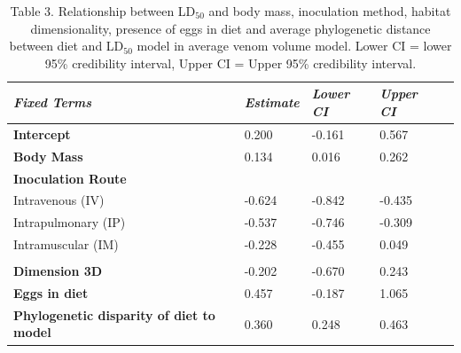 \begin{table}[H]
  \centering
    \caption*{Table 3. Relationship between LD$_{50}$ and body mass, inoculation method, habitat dimensionality, presence of eggs in diet and average phylogenetic distance between diet and LD$_{50}$ model in average venom volume model. Lower CI = lower 95\% credibility interval, Upper CI = Upper 95\% credibility interval.}
\begin{tabular}{*5l}    \toprule
\emph{Fixed Terms} & \emph{Estimate} & \emph{Lower CI} & \emph{Upper CI}\\\midrule
\textbf{Intercept} & 0.200  &  -0.161 & 0.567 \\ 
\textbf{Body Mass} & 0.134  & 0.016 & 0.262 \\ 
\textbf{Inoculation Route} &  &  &  \\ 
 Intravenous (IV) &  -0.624 &  -0.842 &  -0.435 \\
 Intrapulmonary (IP) &  -0.537 &  -0.746 &  -0.309 \\ 
 Intramuscular (IM) &  -0.228 &  -0.455 & 0.049 \\
  &  &  &  \\ 
\textbf{Dimension 3D} &  -0.202 &  -0.670 & 0.243 \\ 
\textbf{Eggs in diet} & 0.457 &  -0.187 & 1.065 \\ 
\textbf{Phylogenetic disparity of diet to model} & 0.360 & 0.248 & 0.463 \\\bottomrule
 \hline
\end{tabular}
  \label{tbl:Table 3.}
\end{table}






